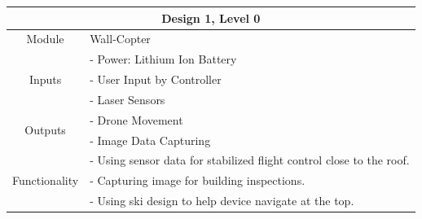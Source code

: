 \documentclass[12pt]{article}
\begin{document}
            \vspace{0.5in}
            \begin{tabular}{|c|l|}
                \hline
                \multicolumn{2}{|c|}{\textbf{Design 1, Level 0}} \\\hline
                Module & Wall-Copter \\\hline
                \multirow{3}{3cm}{Inputs}
                    & - Power: Lithium Ion Battery\\
                    & - User Input by Controller \\
                    & - Laser Sensors \\
                    \hline
                \multirow{2}{3cm}{Outputs}
                    & - Drone Movement \\
                    & - Image Data Capturing \\
                    \hline
                \multirow{3}{3cm}{Functionality}
                    & - Using sensor data for stabilized flight control close to the roof. \\
                    & - Capturing image for building inspections. \\
                    & - Using ski design to help device navigate at the top. \\
                    \hline
                
            \end{tabular}
            \newpage
\end{document}
